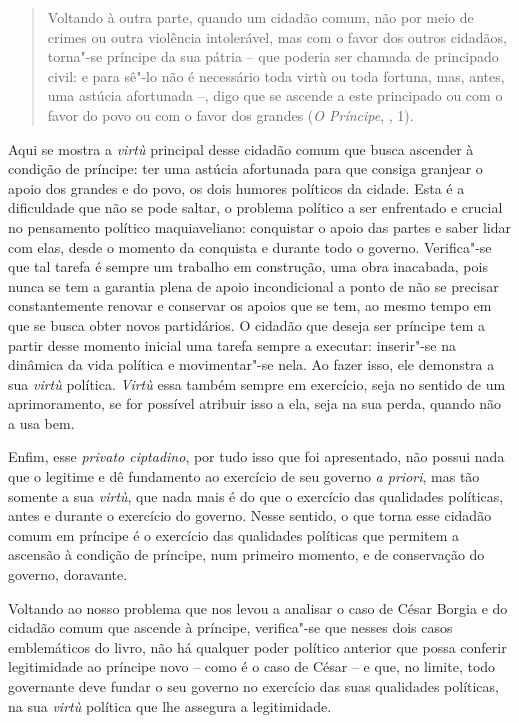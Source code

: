 \begin{quote}
Voltando à outra parte, quando um cidadão comum, não por meio de
crimes ou outra violência intolerável, mas com o favor dos outros
cidadãos, torna"-se príncipe da sua pátria -- que poderia ser chamada de
principado civil: e para sê"-lo não é necessário toda virtù ou toda
fortuna, mas, antes, uma astúcia afortunada --, digo que se ascende a
este principado ou com o favor do povo ou com o favor dos
grandes (\emph{O Príncipe}, , 1).
\end{quote}

Aqui se mostra a \emph{virtù} principal desse cidadão comum que busca
ascender à condição de príncipe: ter uma astúcia afortunada para que
consiga granjear o apoio dos grandes e do povo, os dois humores
políticos da cidade. Esta é a dificuldade que não se pode saltar, o
problema político a ser enfrentado e crucial no pensamento político
maquiaveliano: conquistar o apoio das partes e saber lidar com elas,
desde o momento da conquista e durante todo o governo. Verifica"-se que
tal tarefa é sempre um trabalho em construção, uma obra inacabada, pois
nunca se tem a garantia plena de apoio incondicional a ponto de não se
precisar constantemente renovar e conservar os apoios que se tem, ao
mesmo tempo em que se busca obter novos partidários. O cidadão que
deseja ser príncipe tem a partir desse momento inicial uma tarefa sempre
a executar: inserir"-se na dinâmica da vida política e movimentar"-se
nela. Ao fazer isso, ele demonstra a sua \emph{virtù} política.
\emph{Virtù} essa também sempre em exercício, seja no sentido de um
aprimoramento, se for possível atribuir isso a ela, seja na sua perda,
quando não a usa bem.

Enfim, esse \emph{privato ciptadino}, por tudo isso que foi apresentado,
não possui nada que o legitime e dê fundamento ao exercício de seu
governo \emph{a priori}, mas tão somente a sua \emph{virtù}, que nada
mais é do que o exercício das qualidades políticas, antes e durante o
exercício do governo. Nesse sentido, o que torna esse cidadão comum em
príncipe é o exercício das qualidades políticas que permitem a ascensão
à condição de príncipe, num primeiro momento, e de conservação do
governo, doravante.

Voltando ao nosso problema que nos levou a analisar o caso de César
Borgia e do cidadão comum que ascende à príncipe, verifica"-se que nesses
dois casos emblemáticos do livro, não há qualquer poder político
anterior que possa conferir legitimidade ao príncipe novo -- como é o
caso de César -- e que, no limite, todo governante deve fundar o seu
governo no exercício das suas qualidades políticas, na sua \emph{virtù}
política que lhe assegura a legitimidade.

